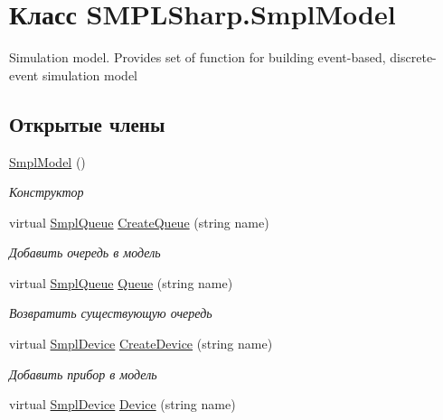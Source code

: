 \hypertarget{class_s_m_p_l_sharp_1_1_smpl_model}{\section{Класс S\-M\-P\-L\-Sharp.\-Smpl\-Model}
\label{df/d34/class_s_m_p_l_sharp_1_1_smpl_model}
}


Simulation model. Provides set of function for building event-\/based, discrete-\/event simulation model  


\subsection*{Открытые члены}
\begin{DoxyCompactItemize}
\item 
\hyperlink{class_s_m_p_l_sharp_1_1_smpl_model_af44997fa13bc821115726c45c7aaad7a}{Smpl\-Model} ()
\begin{DoxyCompactList}\small\item\em Конструктор \end{DoxyCompactList}\item 
virtual \hyperlink{class_s_m_p_l_sharp_1_1_objects_1_1_smpl_queue}{Smpl\-Queue} \hyperlink{class_s_m_p_l_sharp_1_1_smpl_model_ac95017a5bdb0500bb655791303d7cbb2}{Create\-Queue} (string name)
\begin{DoxyCompactList}\small\item\em Добавить очередь в модель \end{DoxyCompactList}\item 
virtual \hyperlink{class_s_m_p_l_sharp_1_1_objects_1_1_smpl_queue}{Smpl\-Queue} \hyperlink{class_s_m_p_l_sharp_1_1_smpl_model_a8c61642d973fd1da0996a3ab0e04b3cc}{Queue} (string name)
\begin{DoxyCompactList}\small\item\em Возвратить существующую очередь \end{DoxyCompactList}\item 
virtual \hyperlink{class_s_m_p_l_sharp_1_1_objects_1_1_smpl_device}{Smpl\-Device} \hyperlink{class_s_m_p_l_sharp_1_1_smpl_model_a1a36f287db98f6e73760dc8f7c2d0497}{Create\-Device} (string name)
\begin{DoxyCompactList}\small\item\em Добавить прибор в модель \end{DoxyCompactList}\item 
virtual \hyperlink{class_s_m_p_l_sharp_1_1_objects_1_1_smpl_device}{Smpl\-Device} \hyperlink{class_s_m_p_l_sharp_1_1_smpl_model_a0c48f93d0d086ef9e340f29a3664fb55}{Device} (string name)

\end{DoxyCompactItemize}
